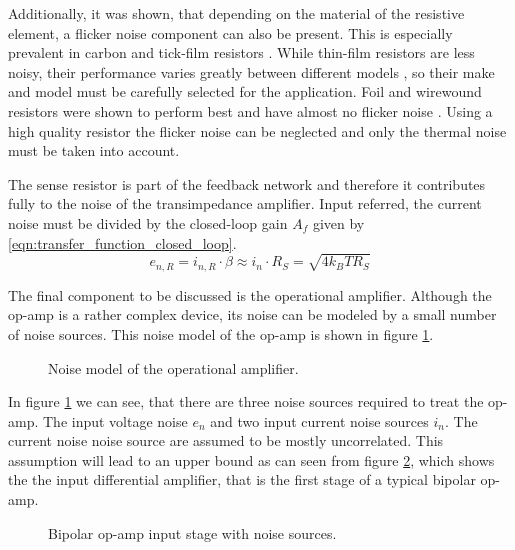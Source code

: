 Additionally, it was shown, that depending on the material of the resistive element, a flicker noise component can also be present. This is especially prevalent in carbon and tick-film resistors \cite{flicker_noise_carbon_film,1_f_noise_thick_film}. While thin-film resistors are less noisy, their performance varies greatly between different models \cite{resistor_current_noise_ligo}, so their make and model must be carefully selected for the application. Foil and wirewound resistors were shown to perform best and have almost no flicker noise \cite{resistor_current_noise_ligo,flicker_noise_foil_resistor_beev}. Using a high quality resistor the flicker noise can be neglected and only the thermal noise must be taken into account.

The sense resistor is part of the feedback network and therefore it contributes fully to the noise of the transimpedance amplifier. Input referred, the current noise must be divided by the closed-loop gain $A_f$ given by \ref{eqn:transfer_function_closed_loop}.
\begin{equation}
    e_{n,R} = i_{n,R} \cdot \beta \approx i_n \cdot R_S = \sqrt{4 k_B T R_S} \label{eqn:noise_sense_resistor}
\end{equation}

The final component to be discussed is the operational amplifier. Although the op-amp is a rather complex device, its noise can be modeled by a small number of noise sources. This noise model of the op-amp is shown in figure \ref{fig:op-amp_noise_model}.

\begin{figure}[ht]
    \centering
    \caption{Noise model of the operational amplifier.}
    \label{fig:op-amp_noise_model}
\end{figure}

In figure \ref{fig:op-amp_noise_model} we can see, that there are three noise sources required to treat the op-amp. The input voltage noise $e_{n}$ and two input current noise sources $i_n$. The current noise noise source are assumed to be mostly uncorrelated. This assumption will lead to an upper bound as can seen from figure \ref{fig:op-amp_input_stage}, which shows the the input differential amplifier, that is the first stage of a typical bipolar op-amp.

\begin{figure}[hb]
    \centering
    \caption{Bipolar op-amp input stage with noise sources.}
    \label{fig:op-amp_input_stage}
\end{figure}

